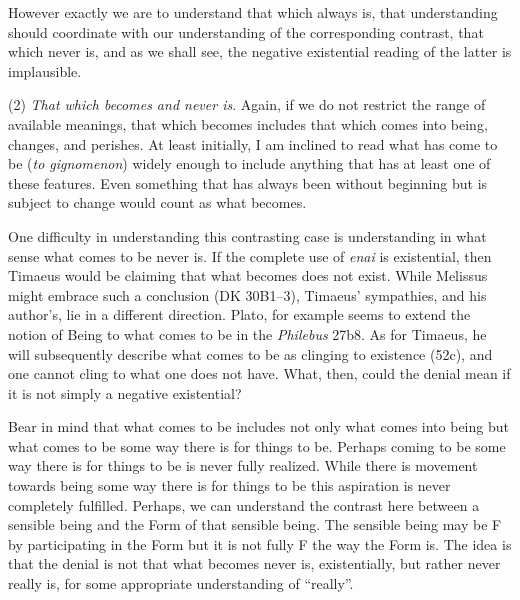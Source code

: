 However exactly we are to understand that which always is, that understanding should coordinate with our understanding of the corresponding contrast, that which never is, and as we shall see, the negative existential reading of the latter is implausible.


(2) \emph{That which becomes and never is}. Again, if we do not restrict the range of available meanings, that which becomes includes that which comes into being, changes, and perishes. At least initially, I am inclined to read what has come to be (\emph{to gignomenon}) widely enough to include anything that has at least one of these features. Even something that has always been without beginning but is subject to change would count as what becomes.

One difficulty in understanding this contrasting case is understanding in what sense what comes to be never is. If the complete use of \emph{enai} is existential, then Timaeus would be claiming that what becomes does not exist. While Melissus might embrace such a conclusion (DK 30B1--3), Timaeus' sympathies, and his author's, lie in a different direction. Plato, for example seems to extend the notion of Being to what comes to be in the \emph{Philebus} 27b8. As for Timaeus, he will subsequently describe what comes to be as clinging to existence (52c), and one cannot cling to what one does not have. What, then, could the denial mean if it is not simply a negative existential?

Bear in mind that what comes to be includes not only what comes into being but what comes to be some way there is for things to be. Perhaps coming to be some way there is for things to be is never fully realized. While there is movement towards being some way there is for things to be this aspiration is never completely fulfilled. Perhaps, we can understand the contrast here between a sensible being and the Form of that sensible being. The sensible being may be F by participating in the Form but it is not fully F the way the Form is. The idea is that the denial is not that what becomes never is, existentially, but rather never really is, for some appropriate understanding of ``really''.

